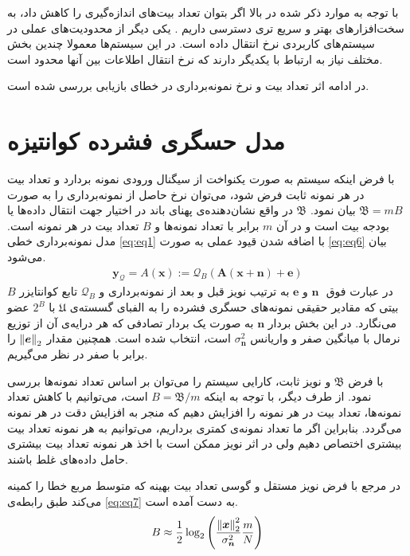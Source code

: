 با توجه به موارد ذکر شده در بالا اگر بتوان تعداد بیت‌های اندازه‌گیری را کاهش داد، به سخت‌افزار‌های بهتر و سریع تری دسترسی داریم
\cite{laska2012regime}.
یکی دیگر از محدودیت‌های عملی در سیستم‌های کاربردی نرخ انتقال داده است. در این سیستم‌ها معمولا چندین بخش مختلف نیاز به ارتباط با یکدیگر دارند که نرخ انتقال اطلاعات بین آنها محدود است. 

در ادامه اثر تعداد بیت و نرخ نمونه‌برداری در خطای بازیابی بررسی شده است.


\section{مدل حسگری فشرده کوانتیزه}
با فرض اینکه سیستم به صورت یکنواخت از سیگنال ورودی نمونه بردارد و تعداد بیت در هر نمونه ثابت فرض شود، می‌توان نرخ حاصل از نمونه‌برداری را به صورت 
$ \mathfrak{B}=mB $
بیان نمود.  
$ \mathfrak{B}$
در واقع نشان‌دهنده‌ی پهنای باند در اختیار جهت انتقال داده‌ها یا  بودجه بیت
است و در آن 
$m$
برابر با تعداد نمونه‌ها و 
$B$
تعداد بیت در هر نمونه است.
 مدل نمونه‌برداری خطی
\eqref{eq:eq1}
 با اضافه شدن قیود عملی به صورت 
\eqref{eq:eq6}
بیان می‌شود.
\begin{align}
\label{eq:eq6}
\bm{y}_{\mathcal{Q}} =A(\bm{x}):= \mathcal{Q}_{B}\left(\bm{A}(\bm{x}+\bm{n})+\bm{e}\right)
\end{align}
در عبارت فوق ‍
$\bm{n}$
و
$\bm{e}$
به ترتیب نویز قبل و بعد از نمونه‌برداری و
$\mathcal{Q}_{B}$
تابع کوانتایزر 
$B$
بیتی که مقادیر حقیقی نمونه‌های حسگری فشرده را به الفبای گسسته‌ی 
$\mathfrak{U}$
با 
$2^{B}$
عضو می‌نگارد. در این بخش بردار
$\bm{n}$
به صورت یک بردار تصادفی که هر درایه‌ی آن از توزیع نرمال با میانگین صفر و واریانس
$\sigma_{\bm{n}}^{2}$
 است، انتخاب شده است. همچنین مقدار
$\left\lVert\bm{e}\right\rVert_{2}$
را برابر با صفر در نظر می‌گیریم.


با فرض 
$ \mathfrak{B}$
و نویز ثابت، کارایی سیستم را می‌توان بر اساس تعداد نمونه‌ها بررسی نمود. از طرف دیگر، با توجه به اینکه 
$B = \mathfrak{B}/m$
است،‌ می‌توانیم با کاهش تعداد نمونه‌ها، تعداد بیت در هر نمونه را افزایش دهیم که منجر به افزایش دقت در هر نمونه می‌گردد. بنابراین اگر ما تعداد نمونه‌ی کمتری برداریم، می‌توانیم به هر نمونه تعداد بیت بیشتری اختصاص دهیم ولی در اثر نویز ممکن است با اخذ هر نمونه تعداد بیت بیشتری حامل داده‌های غلط باشند.

در مرجع
\cite{laska2012regime}
با فرض نویز مستقل و گوسی تعداد بیت بهینه که متوسط مربع خطا
را کمینه می‌کند طبق رابطه‌ی 
\eqref{eq:eq7}
به دست آمده است.
\begin{align}
\label{eq:eq7}
B \approx \dfrac{1}{2}\log_{2}\left( \dfrac{\left\lVert\bm{x}\right\rVert_{2}^{2}}{\sigma^{2}_{\bm{n}}}\dfrac{m}{N}\right)
\end{align}

